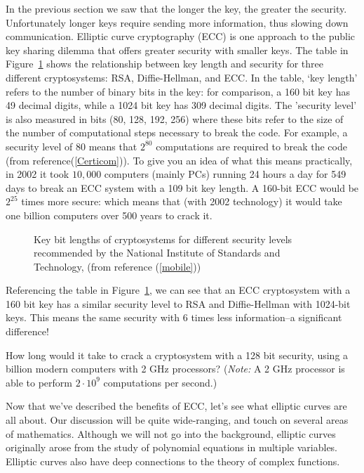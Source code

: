 In the previous section we saw that the longer the key, the greater the security. Unfortunately longer keys require sending more information, thus slowing down communication.  Elliptic curve cryptography (ECC) is one approach to the public key sharing dilemma that offers greater security with smaller keys. The table in Figure~\ref{fig:DH:DHKE_9} shows the relationship between key length and security for three different cryptosystems: RSA, Diffie-Hellman, and ECC.  In the table, `key length' refers to the number of binary bits in the key: for comparison, a 160 bit key has 49 decimal digits, while a 1024 bit key has 309 decimal digits. The 'security level' is also measured in bits (80, 128, 192, 256) where these bits refer to the size of the number of computational steps necessary to break the code.  For example, a security level of 80 means that $2^{80}$ computations are required to break the code (from reference(\ref{Certicom})). To give you an idea of what this means practically, in 2002 it took $10,000$ computers (mainly PCs) running 24 hours a day for 549 days to break an ECC system with a 109 bit key length. A 160-bit ECC would be $2^{25}$ times more secure: which means that (with 2002 technology) it would take one billion computers over 500 years to crack it.
\begin{figure} [H]
	  \caption{\label{fig:DH:DHKE_9}Key bit lengths of cryptosystems for different security levels recommended by the National Institute of Standards and Technology, (from reference (\ref{mobile}))}
\end{figure}
Referencing the table in Figure~\ref{fig:DH:DHKE_9}, we can see that an ECC cryptosystem with a 160 bit key has a similar security level to RSA and Diffie-Hellman with 1024-bit keys. This means the same security with 6 times less information--a significant difference! 

\begin{exercise}\label{exercise:further_crypt:}
How long would it take to crack a cryptosystem with a 128 bit security, using a billion modern computers with 2 GHz processors? (\emph{Note:} A 2 GHz processor is able to perform $2 \cdot 10^9$ computations per second.)
\end{exercise}

Now that we've described the benefits of ECC, let's see what elliptic curves are all about. Our discussion will be quite wide-ranging, and touch on several areas of mathematics. Although we will not go into the background, elliptic curves originally arose from the study of polynomial equations in multiple variables. Elliptic curves also have deep connections to the theory of complex functions. 

